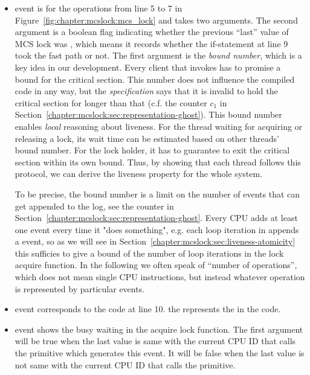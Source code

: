 \begin{itemize}

\item \textbf{{}} event is for the
operations from line 5 to 7 in Figure~\ref{fig:chapter:mcslock:mcs_lock} and takes
two arguments. The second argument is a boolean flag indicating
whether the previous ``last'' value of MCS lock was \invalidmcsval,
which means it records whether the if-statement at line 9 took the fast path or not.
The first argument is the \emph{bound number}, which is a key idea in
our development. Every client that invokes  has
to promise a bound for the critical section. This number
does not influence the compiled code in any way, but the
\emph{specification} says that it is invalid to hold the critical
section for longer than that (c.f. the counter $c_1$ in
Section~\ref{chapter:mcslock:sec:representation-ghost}).
This bound number enables \emph{local} reasoning about liveness.
For the thread waiting for acquiring or releasing a lock,
its wait time can be estimated based on other threads' bound number. For the lock holder, it has to guarantee
to exit the critical section within its own bound. 
Thus, by showing that each thread follows this protocol,
we can derive the liveness property for the whole system.

To be precise, the bound number is a limit on the number of events
that can get appended to the log, see the counter  in
Section~\ref{chapter:mcslock:sec:representation-ghost}.
Every CPU adds at least
one event every time it "does something", e.g. each loop iteration in  appends a 
event, so
as we will see in
Section~\ref{chapter:mcslock:sec:liveness-atomicity} this sufficies to give a bound of
the number of loop iterations in the lock acquire function. In the following we often speak of
``number of operations'', which does not mean single CPU instructions,
but instead whatever operation is represented by particular events.


\item \textbf{} event corresponds to the code at line 10. 
the  represents the  in the code.

\item\textbf{} event shows the busy waiting in the acquire lock function.
The first argument will be true when the last value is same with the current CPU ID that calls the primitive which generates this event.
It will be false when the last value is not same with the current CPU ID that calls the primitive.
\end{itemize}


